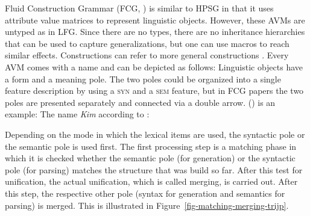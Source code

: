 Fluid Construction Grammar (FCG, \citealp{SteelsFluid-ed}) is similar to HPSG in that it uses
attribute value matrices to represent linguistic objects. However, these AVMs are untyped as in
LFG. Since there are no types, there are no inheritance hierarchies that can be used to capture generalizations, but one can use macros to reach
similar effects. Constructions can refer to more general constructions \citep[]{vanTrijp2013a}. Every AVM
comes with a name and can be depicted as follows:
\ea
{}
\z
\largerpage[2]
Linguistic objects have a form and a meaning pole. The two poles could be organized into a single feature
description by using a \textsc{syn} and a \textsc{sem} feature, but in FCG papers the two poles are
presented separately and connected via a double arrow. () is an example:
\eas
The name \emph{Kim} according to \citet[]{vanTrijp2013a}:\\
\zs
Depending on the mode in which the lexical items are used, the syntactic pole or the semantic pole
is used first. The first processing step is a matching phase in which it is checked whether the
semantic pole (for generation) or the syntactic pole (for parsing) matches the structure that was
build so far. After this test for unification, the actual unification, which is called merging, is
carried out. After this step, the respective other pole (syntax for generation and semantics for
parsing) is merged. This is illustrated in Figure~\ref{fig-matching-merging-trijp}.

